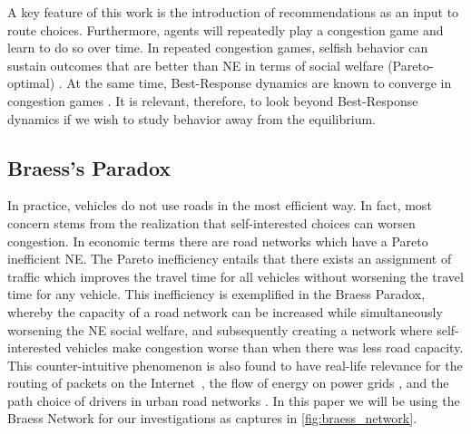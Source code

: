 A key feature of this work is the introduction of recommendations as an input to route choices.
Furthermore, agents will repeatedly play a congestion game and learn to do so over time. In repeated congestion games, selfish behavior can sustain outcomes that are better than NE in terms of social welfare (Pareto-optimal) \cite{scarsini2012repeated}. At the same time, Best-Response dynamics are known to converge in congestion games \cite{candogan2013near}. It is relevant, therefore, to look beyond Best-Response dynamics if we wish to study behavior away from the equilibrium. 


\subsection{Braess's Paradox}

In practice, vehicles do not use roads in the most efficient way. In fact, most concern stems from the realization that self-interested choices can worsen congestion. In economic terms there are road networks which have a Pareto inefficient NE. The Pareto inefficiency entails that there exists an assignment of traffic which improves the travel time for all vehicles without worsening the travel time for any vehicle. This inefficiency is exemplified in the Braess Paradox, whereby the capacity of a road network can be increased while simultaneously worsening the NE social welfare, and subsequently creating a network where self-interested vehicles make congestion worse than when there was less road capacity. This counter-intuitive phenomenon is also found to have real-life relevance for the routing of packets on the Internet~\cite{korilis1999avoiding, tumer2000collective}, the flow of energy on power grids \cite{schafer2022understanding}, and the path choice of drivers in urban road networks \cite{argota4291171less}. In this paper we will be using the Braess Network for our investigations as captures in \autoref{fig:braess_network}.


